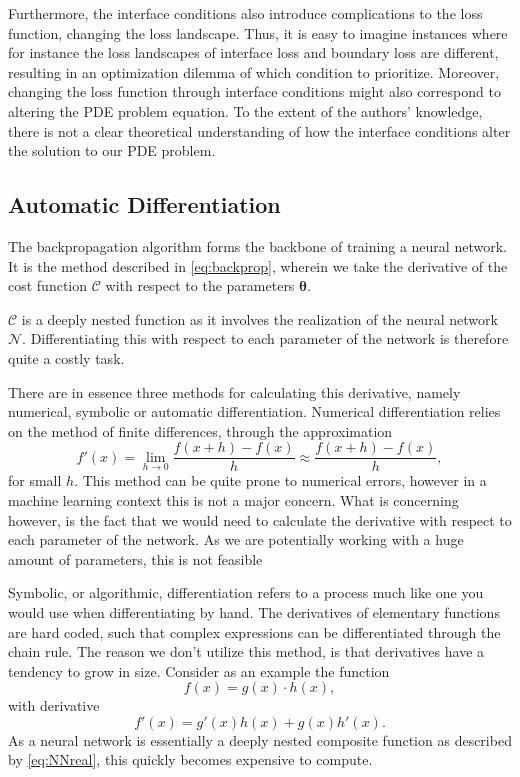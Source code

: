 Furthermore, the interface conditions also introduce complications to the loss function, changing the loss landscape.
Thus, it is easy to imagine instances where for instance the loss landscapes of interface loss and boundary loss are different, resulting in an optimization dilemma of which condition to prioritize.
Moreover, changing the loss function through interface conditions might also correspond to altering the PDE problem equation.
To the extent of the authors' knowledge, there is not a clear theoretical understanding of how the interface conditions alter the solution to our PDE problem. 

\subsection{Automatic Differentiation}\label{sec:autodiff}
The backpropagation algorithm \cite{Backpropogation1986} forms the backbone of training a neural network.
It is the method described in \eqref{eq:backprop}, wherein we take the derivative of the cost function $\mathcal{C}$ with respect to the parameters $\boldsymbol{\theta}$.

$\mathcal{C}$ is a deeply nested function as it involves the realization of the neural network $\mathcal{N}$.
Differentiating this with respect to each parameter of the network is therefore quite a costly task.

There are in essence three methods for calculating this derivative, namely numerical, symbolic or automatic differentiation.
Numerical differentiation relies on the method of finite differences, through the approximation
\begin{equation}
    f'(x) = \lim_{h \to 0} \frac{f(x+h) - f(x)}{h} \approx \frac{f(x + h) - f(x)}{h},
\end{equation}
for small $h$.
This method can be quite prone to numerical errors, however in a machine learning context this is not a major concern.
What is concerning however, is the fact that we would need to calculate the derivative with respect to each parameter of the network.
As we are potentially working with a huge amount of parameters, this is not feasible

Symbolic, or algorithmic, differentiation refers to a process much like one you would use when differentiating by hand.
The derivatives of elementary functions are hard coded, such that complex expressions can be differentiated through the chain rule.
The reason we don't utilize this method, is that derivatives have a tendency to grow in size.
Consider as an example the function
\begin{equation}
    f(x) = g(x) \cdot h(x),
\end{equation}
with derivative
\begin{equation}
    f'(x) = g'(x) h(x) + g(x) h'(x).
\end{equation}
As a neural network is essentially a deeply nested composite function as described by \eqref{eq:NNreal}, this quickly becomes expensive to compute.

